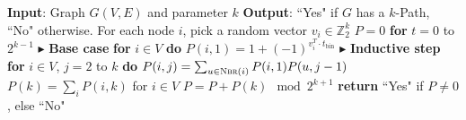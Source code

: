 \begin{algorithm}{}
\small
\caption{\small \maxwt{}$(G(V, E), k)$.}
\label{alg:maxwt}
\begin{algorithmic}[1]
\STATE \textbf{Input}: Graph $G(V, E)$ and parameter $k$
\STATE\textbf{Output}: ``Yes" if $G$ has a $k$-Path, ``No" otherwise.
\STATE
\STATE For each node $i$, pick a random vector $v_i \in \mathbb{Z}_{2}^k$
\STATE $P = 0$
\STATE \textbf{for} $t = 0$ to $2^{k-1}$
\STATE \quad $\blacktriangleright$ \textbf{Base case}
\STATE \quad \textbf{for} $i \in V$ \textbf{do}
\STATE \quad \quad $P(i, 1) = 1 + (-1)^{v_i^T \cdot t_{\text{bin}}}$
\STATE \quad $\blacktriangleright$ \textbf{Inductive step}
\STATE \quad \textbf{for} $i \in V$, $j = 2$ to $k$ \textbf{do}
\STATE \quad \quad
$P(i,j) = \sum_{u \in \textsc{Nbr}(i)} P(i, 1)P(u, j-1)$
\STATE \quad $P(k) = \sum_i P(i,k)$ for $i \in V$
\STATE \quad $P = P + P(k)  \mod 2^{k+1}$
\STATE \textbf{return} ``Yes" if $P \neq 0$, else ``No"
\end{algorithmic}
\end{algorithm}

